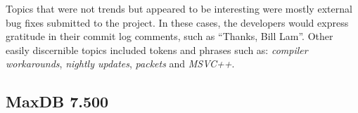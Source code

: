 \documentclass[times, 10pt,twocolumn]{article}
\begin{document}
Topics that were not trends but appeared to be interesting were mostly
external bug fixes submitted to the project.  In these cases, the
developers would express gratitude in their commit log comments, such
as ``Thanks, Bill Lam''.  Other easily discernible topics included
tokens and phrases such as: \emph{compiler workarounds}, \emph{nightly
  updates}, \emph{packets} and \emph{MSVC++}.







\subsection{MaxDB 7.500}



\end{document}
